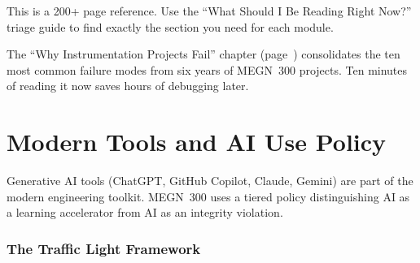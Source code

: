 \documentclass[11pt,letterpaper,twoside,openany]{book}
\begin{document}
\begin{warningbox}
This is a 200+ page reference. Use the ``What Should I Be Reading Right Now?'' triage guide to find exactly the section you need for each module.
\end{warningbox}

\begin{tipbox}
The ``Why Instrumentation Projects Fail'' chapter (page~\pageref{ch:projects_fail}) consolidates the ten most common failure modes from six years of MEGN~300 projects. Ten minutes of reading it now saves hours of debugging later.
\end{tipbox}

\newpage
\chapter*{Modern Tools and AI Use Policy}
\label{ch:aipolicy}

Generative AI tools (ChatGPT, GitHub Copilot, Claude, Gemini) are part of the modern engineering toolkit. MEGN~300 uses a tiered policy distinguishing AI as a learning accelerator from AI as an integrity violation.

\subsection*{The Traffic Light Framework}
\end{document}
